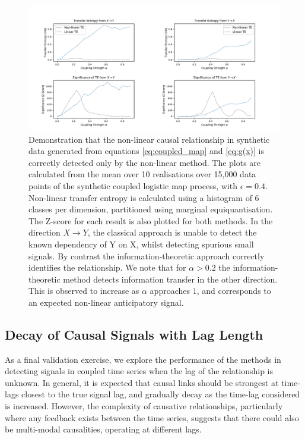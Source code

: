 \documentclass[]{rsos}%
\begin{document}
\begin{figure}[!htb]
    \includegraphics[width=\linewidth]{images/confirming_logmap.pdf}
    \caption{Demonstration that the non-linear causal relationship in synthetic data generated from equations \ref{eq:coupled_map} and \ref{eq:g(x)} is {\color{blue}correctly} detected only by the non-linear method. The plots are calculated from the mean over 10 realisations over 15,000 data points of the synthetic coupled logistic map process, with $\epsilon = 0.4$. Non-linear transfer entropy is calculated using a histogram of 6 classes per dimension, partitioned using marginal equiquantisation. The Z-score for each result is also plotted for both methods. In the direction $X \rightarrow Y$, {\color{blue} the classical approach is unable to detect the known dependency of Y on X, whilst detecting spurious small signals. By contrast the information-theoretic approach correctly identifies the relationship}.  We note that for $\alpha>0.2$ the information-theoretic method detects information transfer in the other direction. This is observed to increase as $\alpha$ approaches $1$, and corresponds to an expected non-linear anticipatory signal.
    }
    \label{fig:CLM_confirmation}
  \end{figure}

  \subsection{Decay of Causal Signals with Lag Length}
  As a final validation exercise, we explore the performance of the methods in detecting signals in coupled time series when the lag of the relationship is unknown. In general, it is expected that causal links should be strongest at time-lags closest to the true signal lag, and gradually decay as the time-lag considered is increased. However, the complexity of causative relationships, particularly where any feedback exists between the time series, suggests that there could also be multi-modal causalities, operating at different lags.  
\end{document}
